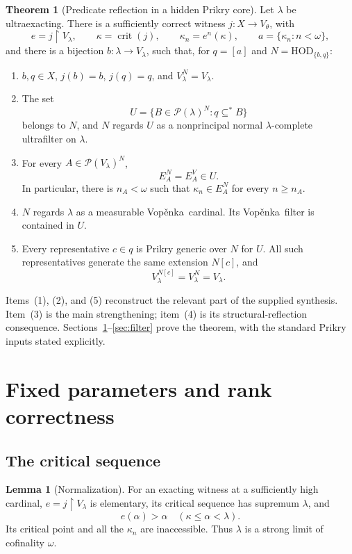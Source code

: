 \documentclass[11pt,letterpaper]{article}
\theoremstyle{definition}
\newtheorem{theorem}[definition]{Theorem}
\newtheorem{lemma}[definition]{Lemma}
\numberwithin{equation}{section}
\newcommand{\HOD}{\mathrm{HOD}}
\newcommand{\crit}{\operatorname{crit}}
\newcommand{\Pow}{\mathcal P}
\newcommand{\restr}{\mathbin{\upharpoonright}}
\newcommand{\Vop}{Vop\v{e}nka}
\newcommand{\substar}{\subseteq^{*}}
\newcommand{\Ncore}{\HOD_{\{b,q\}}}
\begin{document}
\begin{theorem}[Predicate reflection in a hidden Prikry core]\label{thm:main}
Let $\lambda$ be ultraexacting. There is a sufficiently correct witness $j:X\to V_\theta$, with
\[
 e=j\restr V_\lambda,\qquad \kappa=\crit(j),\qquad
 \kappa_n=e^n(\kappa),\qquad a=\{\kappa_n:n<\omega\},
\]
and there is a bijection $b:\lambda\to V_\lambda$, such that, for $q=[a]$ and $N=\Ncore$:
\begin{enumerate}
\item $b,q\in X$, $j(b)=b$, $j(q)=q$, and $V_\lambda^N=V_\lambda$.
\item The set
\begin{equation}\label{eq:U}
 U=\{B\in\Pow(\lambda)^N:q\substar B\}
\end{equation}
belongs to $N$, and $N$ regards $U$ as a nonprincipal normal $\lambda$-complete ultrafilter on $\lambda$.
\item For every $A\in\Pow(V_\lambda)^N$,
\begin{equation}\label{eq:concentration}
 E_A^N=E_A^V\in U.
\end{equation}
In particular, there is $n_A<\omega$ such that $\kappa_n\in E_A^N$ for every $n\ge n_A$.
\item $N$ regards $\lambda$ as a measurable \Vop\ cardinal. Its \Vop\ filter is contained in $U$.
\item Every representative $c\in q$ is Prikry generic over $N$ for $U$. All such representatives generate the same extension $N[c]$, and
\[
 V_\lambda^{N[c]}=V_\lambda^N=V_\lambda.
\]
\end{enumerate}
\end{theorem}

Items~(1), (2), and (5) reconstruct the relevant part of the supplied synthesis. Item~(3) is the main strengthening; item~(4) is its structural-reflection consequence. Sections~\ref{sec:bookkeeping}--\ref{sec:filter} prove the theorem, with the standard Prikry inputs stated explicitly.

\section{Fixed parameters and rank correctness}\label{sec:bookkeeping}

\subsection{The critical sequence}

\begin{lemma}[Normalization]\label{lem:normalization}
For an exacting witness at a sufficiently high cardinal, $e=j\restr V_\lambda$ is elementary, its critical sequence has supremum $\lambda$, and
\begin{equation}\label{eq:moved}
 e(\alpha)>\alpha\quad(\kappa\le\alpha<\lambda).
\end{equation}
Its critical point and all the $\kappa_n$ are inaccessible. Thus $\lambda$ is a strong limit of cofinality $\omega$.
\end{lemma}
\end{document}
